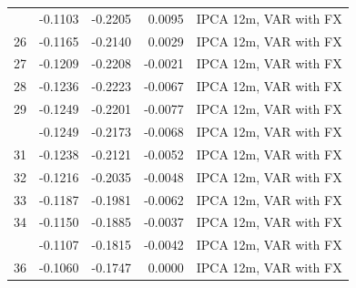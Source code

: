 \begin{tabular}{rrrrl}
\addlinespace
25 & -0.1103 & -0.2205 & 0.0095 & IPCA 12m, VAR with FX\\
26 & -0.1165 & -0.2140 & 0.0029 & IPCA 12m, VAR with FX\\
27 & -0.1209 & -0.2208 & -0.0021 & IPCA 12m, VAR with FX\\
28 & -0.1236 & -0.2223 & -0.0067 & IPCA 12m, VAR with FX\\
29 & -0.1249 & -0.2201 & -0.0077 & IPCA 12m, VAR with FX\\
\addlinespace
30 & -0.1249 & -0.2173 & -0.0068 & IPCA 12m, VAR with FX\\
31 & -0.1238 & -0.2121 & -0.0052 & IPCA 12m, VAR with FX\\
32 & -0.1216 & -0.2035 & -0.0048 & IPCA 12m, VAR with FX\\
33 & -0.1187 & -0.1981 & -0.0062 & IPCA 12m, VAR with FX\\
34 & -0.1150 & -0.1885 & -0.0037 & IPCA 12m, VAR with FX\\
\addlinespace
35 & -0.1107 & -0.1815 & -0.0042 & IPCA 12m, VAR with FX\\
36 & -0.1060 & -0.1747 & 0.0000 & IPCA 12m, VAR with FX\\
\bottomrule
\end{tabular}
